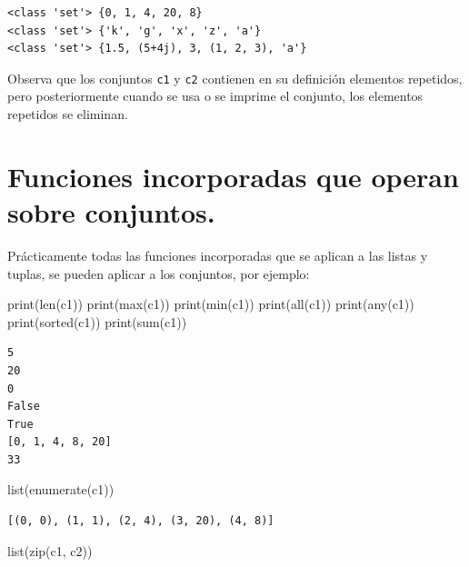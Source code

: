 \documentclass[
  spanish,
  letterpaper,
]{scrbook}
\newenvironment{Shaded}{\begin{snugshade}}{\end{snugshade}}
\newcommand{\BuiltInTok}[1]{\textcolor[rgb]{0.00,0.23,0.31}{#1}}
\newcommand{\NormalTok}[1]{\textcolor[rgb]{0.00,0.23,0.31}{#1}}
\theoremstyle{definition}
\theoremstyle{remark}
\begin{document}
\begin{verbatim}
<class 'set'> {0, 1, 4, 20, 8}
<class 'set'> {'k', 'g', 'x', 'z', 'a'}
<class 'set'> {1.5, (5+4j), 3, (1, 2, 3), 'a'}
\end{verbatim}

Observa que los conjuntos \texttt{c1} y \texttt{c2} contienen en su
definición elementos repetidos, pero posteriormente cuando se usa o se
imprime el conjunto, los elementos repetidos se eliminan.

\section{Funciones incorporadas que operan sobre
conjuntos.}\label{funciones-incorporadas-que-operan-sobre-conjuntos.}

Prácticamente todas las funciones incorporadas que se aplican a las
listas y tuplas, se pueden aplicar a los conjuntos, por ejemplo:

\begin{Shaded}
\begin{Highlighting}[]
\BuiltInTok{print}\NormalTok{(}\BuiltInTok{len}\NormalTok{(c1))}
\BuiltInTok{print}\NormalTok{(}\BuiltInTok{max}\NormalTok{(c1))}
\BuiltInTok{print}\NormalTok{(}\BuiltInTok{min}\NormalTok{(c1))}
\BuiltInTok{print}\NormalTok{(}\BuiltInTok{all}\NormalTok{(c1))}
\BuiltInTok{print}\NormalTok{(}\BuiltInTok{any}\NormalTok{(c1))}
\BuiltInTok{print}\NormalTok{(}\BuiltInTok{sorted}\NormalTok{(c1))}
\BuiltInTok{print}\NormalTok{(}\BuiltInTok{sum}\NormalTok{(c1))}
\end{Highlighting}
\end{Shaded}

\begin{verbatim}
5
20
0
False
True
[0, 1, 4, 8, 20]
33
\end{verbatim}

\begin{Shaded}
\begin{Highlighting}[]
\BuiltInTok{list}\NormalTok{(}\BuiltInTok{enumerate}\NormalTok{(c1)) }
\end{Highlighting}
\end{Shaded}

\begin{verbatim}
[(0, 0), (1, 1), (2, 4), (3, 20), (4, 8)]
\end{verbatim}

\begin{Shaded}
\begin{Highlighting}[]
\BuiltInTok{list}\NormalTok{(}\BuiltInTok{zip}\NormalTok{(c1, c2)) }
\end{Highlighting}
\end{Shaded}
\end{document}
